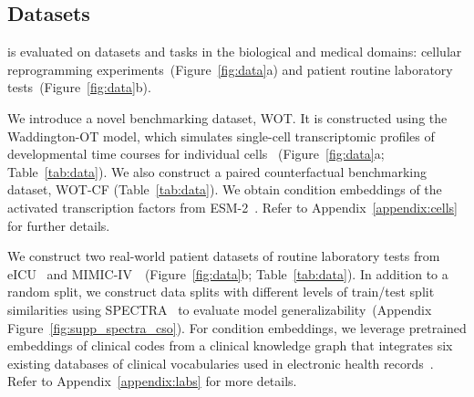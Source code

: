 
\subsection{Datasets}

\name is evaluated on datasets and tasks in the biological and medical domains: cellular reprogramming experiments~(Figure~\ref{fig:data}a) and patient routine laboratory tests~(Figure~\ref{fig:data}b).

 We introduce a novel benchmarking dataset, WOT. It is constructed using the Waddington-OT model, which simulates single-cell transcriptomic profiles of developmental time courses for individual cells \cite{schiebinger2019-ie}~(Figure~\ref{fig:data}a; Table~\ref{tab:data}). We also construct a paired counterfactual benchmarking dataset, WOT-CF (Table~\ref{tab:data}). We obtain condition embeddings of the activated transcription factors from ESM-2~\cite{lin2022language}. Refer to Appendix~\ref{appendix:cells} for further details.


%
We construct two real-world patient datasets of routine laboratory tests from eICU~\cite{pollard2018eicu} and MIMIC-IV~\cite{johnson2024mimic, johnson2023mimic, goldberger2000physiobank}~(Figure~\ref{fig:data}b; Table~\ref{tab:data}). In addition to a random split, we construct data splits with different levels of train/test split similarities using SPECTRA~\cite{ektefaie2024evaluating} to evaluate model generalizability~(Appendix Figure~\ref{fig:supp_spectra_cso}). For condition embeddings, we leverage pretrained embeddings of clinical codes from a clinical knowledge graph that integrates six existing databases of clinical vocabularies used in electronic health records~\cite{johnson2024unified}. Refer to Appendix~\ref{appendix:labs} for more details. 



